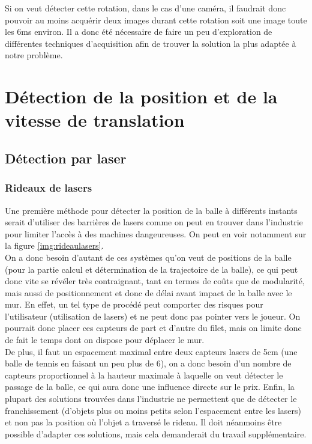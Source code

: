 Si on veut détecter cette rotation, dans le cas d'une caméra, il faudrait donc pouvoir au moins acquérir deux images durant cette rotation soit une image toute les 6ms environ. Il a donc été nécessaire de faire un peu d'exploration de différentes techniques d'acquisition afin de trouver la solution la plus adaptée à notre problème.


\section{Détection de la position et de la vitesse de translation}



\subsection{Détection par laser}

\subsubsection{Rideaux de lasers}

Une première méthode pour détecter la position de la balle à différents instants serait d'utiliser des barrières de lasers comme on peut en trouver dans l'industrie pour limiter l'accès à des machines dangeureuses. On peut en voir notamment sur la figure \ref{img:rideaulasers}. \\

On a donc besoin d'autant de ces systèmes qu'on veut de positions de la balle (pour la partie calcul et détermination de la trajectoire de la balle), ce qui peut donc vite se révéler très contraignant, tant en termes de coûts que de modularité, mais aussi de positionnement et donc de délai avant impact de la balle avec le mur. En effet, un tel type de procédé peut comporter des risques pour l'utilisateur (utilisation de lasers) et ne peut donc pas pointer vers le joueur. On pourrait donc placer ces capteurs de part et d'autre du filet, mais on limite donc de fait le temps dont on dispose pour déplacer le mur. \\

De plus, il faut un espacement maximal entre deux capteurs lasers de 5cm (une balle de tennis en faisant un peu plus de 6), on a donc besoin d'un nombre de capteurs proportionnel à la hauteur maximale à laquelle on veut détecter le passage de la balle, ce qui aura donc une influence directe sur le prix. Enfin, la plupart des solutions trouvées dans l'industrie ne permettent que de détecter le franchissement (d'objets plus ou moins petits selon l'espacement entre les lasers) et non pas la position où l'objet a traversé le rideau. Il doit néanmoins être possible d'adapter ces solutions, mais cela demanderait du travail supplémentaire. 


